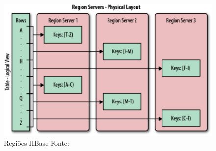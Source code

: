 \begin{figure}[ht!]
	\centering
	\includegraphics[keepaspectratio=true,scale=0.5]
	  {figuras/hbase-region.eps}
	\caption[Regiões HBase]{Regiões HBase
	\protect\linebreak Fonte: \cite{george2011}}
	\label{fig-hbase-region}
\end{figure}
\FloatBarrier

